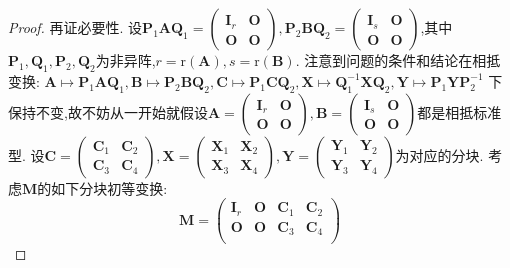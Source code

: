\documentclass[../../main.tex]{subfiles}%
\begin{document}
\begin{proof}
再证必要性. 设\(\boldsymbol{P}_1\boldsymbol{A}\boldsymbol{Q}_1=\begin{pmatrix}
\boldsymbol{I}_r&\boldsymbol{O}\\
\boldsymbol{O}&\boldsymbol{O}
\end{pmatrix},\boldsymbol{P}_2\boldsymbol{B}\boldsymbol{Q}_2=\begin{pmatrix}
\boldsymbol{I}_s&\boldsymbol{O}\\
\boldsymbol{O}&\boldsymbol{O}
\end{pmatrix}\),其中\(\boldsymbol{P}_1,\boldsymbol{Q}_1,\boldsymbol{P}_2,\boldsymbol{Q}_2\)为非异阵,\(r = \mathrm{r}(\boldsymbol{A}),s=\mathrm{r}(\boldsymbol{B})\). 注意到问题的条件和结论在相抵变换:
\(\boldsymbol{A}\mapsto\boldsymbol{P}_1\boldsymbol{A}\boldsymbol{Q}_1,\boldsymbol{B}\mapsto\boldsymbol{P}_2\boldsymbol{B}\boldsymbol{Q}_2,\boldsymbol{C}\mapsto\boldsymbol{P}_1\boldsymbol{C}\boldsymbol{Q}_2,\boldsymbol{X}\mapsto\boldsymbol{Q}_1^{-1}\boldsymbol{X}\boldsymbol{Q}_2,\boldsymbol{Y}\mapsto\boldsymbol{P}_1\boldsymbol{Y}\boldsymbol{P}_2^{-1}\)
下保持不变,故不妨从一开始就假设\(\boldsymbol{A}=\begin{pmatrix}
\boldsymbol{I}_r&\boldsymbol{O}\\
\boldsymbol{O}&\boldsymbol{O}
\end{pmatrix},\boldsymbol{B}=\begin{pmatrix}
\boldsymbol{I}_s&\boldsymbol{O}\\
\boldsymbol{O}&\boldsymbol{O}
\end{pmatrix}\)都是相抵标准型. 设\(\boldsymbol{C}=\begin{pmatrix}
\boldsymbol{C}_1&\boldsymbol{C}_2\\
\boldsymbol{C}_3&\boldsymbol{C}_4
\end{pmatrix},\boldsymbol{X}=\begin{pmatrix}
\boldsymbol{X}_1&\boldsymbol{X}_2\\
\boldsymbol{X}_3&\boldsymbol{X}_4
\end{pmatrix},\boldsymbol{Y}=\begin{pmatrix}
\boldsymbol{Y}_1&\boldsymbol{Y}_2\\
\boldsymbol{Y}_3&\boldsymbol{Y}_4
\end{pmatrix}\)为对应的分块. 考虑\(\boldsymbol{M}\)的如下分块初等变换:
\[
\boldsymbol{M}=\begin{pmatrix}
\boldsymbol{I}_r&\boldsymbol{O}&\boldsymbol{C}_1&\boldsymbol{C}_2\\
\boldsymbol{O}&\boldsymbol{O}&\boldsymbol{C}_3&\boldsymbol{C}_4\\

\end{pmatrix}\]
\end{proof}
\end{document}
